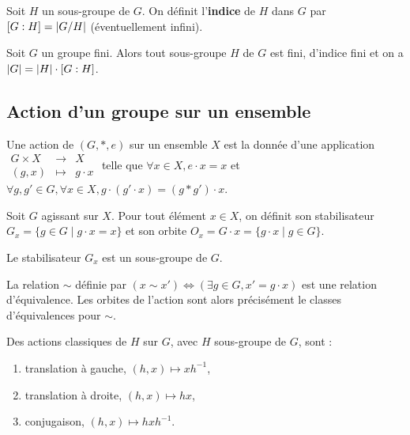 	\begin{defn}
		Soit $H$ un sous-groupe de $G$.
		On définit l'\textbf{indice} de $H$ dans $G$ par $[G : H] = \left\lvert G/H\right\rvert$ (éventuellement infini).
	\end{defn}

	\begin{pop}
		Soit $G$ un groupe fini.
		Alors tout sous-groupe $H$ de $G$ est fini, d'indice fini et on a $\left\lvert G\right\rvert = \left\lvert H\right\rvert \cdot [G : H]$.
	\end{pop}


\subsection{Action d'un groupe sur un ensemble}

	\begin{defn}
		Une action de $(G,*,e)$ sur un ensemble $X$ est la donnée d'une application
		$\begin{array}{ccc} G \times X & \to & X \\ (g,x) & \mapsto & g \cdot x \end{array}$
		telle que $\forall x \in X, e \cdot x = x$ et $\forall g, g' \in G, \forall x \in X, g \cdot (g' \cdot x) = (g * g') \cdot x$.
	\end{defn}

	\begin{defn}
		Soit $G$ agissant sur $X$.
		Pour tout élément $x \in X$, on définit son stabilisateur $G_x = \{ g \in G \mid g \cdot x = x \}$ et son orbite $O_x = G \cdot x = \{ g \cdot x \mid g \in G \}$.
	\end{defn}

	\begin{pop}
		Le stabilisateur $G_x$ est un sous-groupe de $G$.
	\end{pop}

	\begin{pop}
		La relation $\sim$ définie par $(x \sim x') \iff (\exists g \in G, x' = g \cdot x)$ est une relation d'équivalence.
		Les orbites de l'action sont alors précisément le classes d'équivalences pour $\sim$.
	\end{pop}

	\begin{ex}
		Des actions classiques de $H$ sur $G$, avec $H$ sous-groupe de $G$, sont :
		\begin{enumerate}
			\item translation à gauche, $(h,x) \mapsto x h^{-1}$,
			\item translation à droite, $(h,x) \mapsto hx$,
			\item conjugaison, $(h,x) \mapsto h x h^{-1}$.
		\end{enumerate}
	\end{ex}


